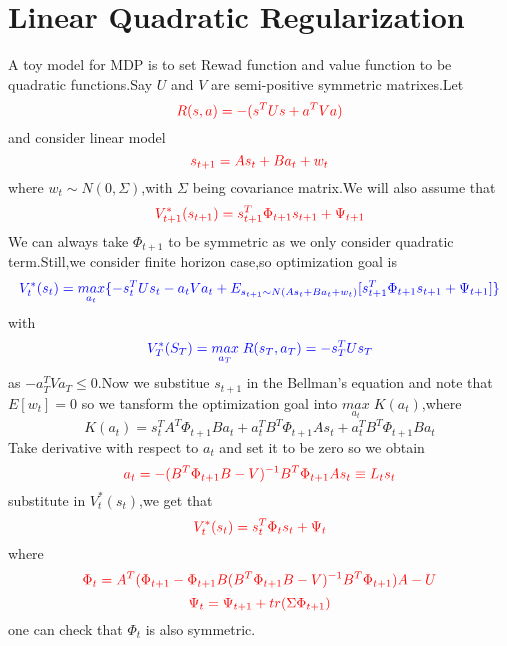 \documentclass{article}
\begin{document}
\section{Linear Quadratic Regularization}
A toy model for MDP is to set Rewad function and value function to be quadratic functions.Say $U$ and $V$ are semi-positive symmetric matrixes.Let$$\textcolor{red}{R(s,a)=-(s^TUs+a^TVa)}$$and consider linear model$$\textcolor{red}{s_{t+1}=As_t+Ba_t+w_t}$$where $w_t\sim N(0,\Sigma)$,with $\Sigma$ being covariance matrix.We will also assume that$$\textcolor{red}{V^*_{t+1}(s_{t+1})=s^T_{t+1}\Phi_{t+1}s_{t+1}+\Psi_{t+1}}$$We can always take $\Phi_{t+1}$ to be symmetric as we only consider quadratic term.Still,we consider finite horizon case,so optimization goal is$$\textcolor{blue}{V^*_t(s_t)=\underset{a_t}{max}\{-s^T_tUs_t-a_tVa_t+E_{s_{t+1}\sim N(As_t+Ba_t+w_t)}[s_{t+1}^T\Phi_{t+1}s_{t+1}+\Psi_{t+1}]\}}$$with$$\textcolor{blue}{V^*_T(S_T)=\underset{a_T}{max}\;R(s_T,a_T)=-s^T_TUs_T}$$as $-a^T_TVa_T\le0$.Now we substitue $s_{t+1}$ in the Bellman's equation and note that $E[w_t]=0$ so we tansform the optimization goal into $\underset{a_t}{max}\;K(a_t)$,where$$K(a_t)=s^T_tA^T\Phi_{t+1}Ba_t+a^T_tB^T\Phi_{t+1}As_t+a^T_tB^T\Phi_{t+1}Ba_t$$Take derivative with respect to $a_t$ and set it to be zero so we obtain$$\textcolor{red}{a_t=-(B^T\Phi_{t+1}B-V)^{-1}B^T\Phi_{t+1}As_t\equiv L_ts_t}$$substitute in $V^*_t(s_t)$,we get that$$\textcolor{red}{V^*_t(s_t)=s^T_t\Phi_ts_t+\Psi_t}$$where
$$\textcolor{red}{\Phi_t=A^T(\Phi_{t+1}-\Phi_{t+1}B(B^T\Phi_{t+1}B-V)^{-1}B^T\Phi_{t+1})A-U}$$
$$\textcolor{red}{\Psi_t=\Psi_{t+1}+tr(\Sigma\Phi_{t+1})}$$
one can check that $\Phi_t$ is also symmetric.
\end{document}

